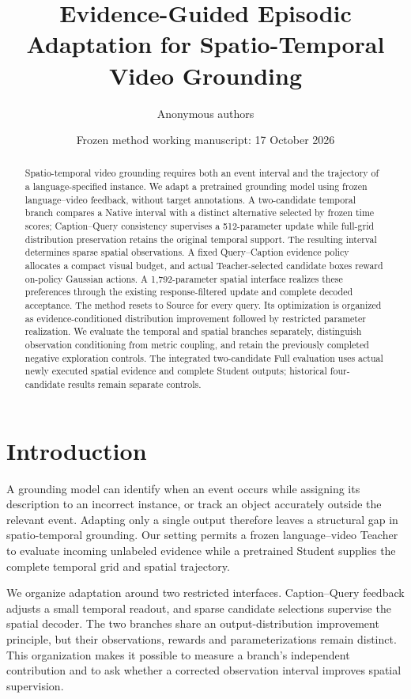 \documentclass[11pt]{article}
\title{Evidence-Guided Episodic Adaptation for Spatio-Temporal Video Grounding}
\author{Anonymous authors}
\date{Frozen method working manuscript: 17 October 2026}
\begin{document}
\maketitle
\begin{abstract}
Spatio-temporal video grounding requires both an event interval and the trajectory of a language-specified instance. We adapt a pretrained grounding model using frozen language--video feedback, without target annotations. A two-candidate temporal branch compares a Native interval with a distinct alternative selected by frozen time scores; Caption--Query consistency supervises a 512-parameter update while full-grid distribution preservation retains the original temporal support. The resulting interval determines sparse spatial observations. A fixed Query--Caption evidence policy allocates a compact visual budget, and actual Teacher-selected candidate boxes reward on-policy Gaussian actions. A 1,792-parameter spatial interface realizes these preferences through the existing response-filtered update and complete decoded acceptance. The method resets to Source for every query. Its optimization is organized as evidence-conditioned distribution improvement followed by restricted parameter realization. We evaluate the temporal and spatial branches separately, distinguish observation conditioning from metric coupling, and retain the previously completed negative exploration controls. The integrated two-candidate Full evaluation uses actual newly executed spatial evidence and complete Student outputs; historical four-candidate results remain separate controls.
\end{abstract}

\section{Introduction}
A grounding model can identify when an event occurs while assigning its description to an incorrect instance, or track an object accurately outside the relevant event. Adapting only a single output therefore leaves a structural gap in spatio-temporal grounding. Our setting permits a frozen language--video Teacher to evaluate incoming unlabeled evidence while a pretrained Student supplies the complete temporal grid and spatial trajectory.

We organize adaptation around two restricted interfaces. Caption--Query feedback adjusts a small temporal readout, and sparse candidate selections supervise the spatial decoder. The two branches share an output-distribution improvement principle, but their observations, rewards and parameterizations remain distinct. This organization makes it possible to measure a branch's independent contribution and to ask whether a corrected observation interval improves spatial supervision.
\end{document}

